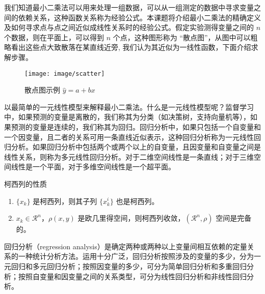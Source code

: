 \documentclass[cn,11pt,fancy,hide]{elegantbook}
\providecommand{\tightlist}{%
  \setlength{\itemsep}{0pt}\setlength{\parskip}{0pt}}
\begin{document}
我们知道最小二乘法可以用来处理一组数据，可以从一组测定的数据中寻求变量之间的依赖关系，这种函数关系称为经验公式。本课题将介绍最小二乘法的精确定义及如何寻求点与点之间近似成线性关系时的经验公式。假定实验测得变量之间的 \(n\) 个数据，则在平面上，可以得到 \(n\) 个点，这种图形称为 ``散点图''，从图中可以粗略看出这些点大致散落在某直线近旁, 我们认为其近似为一线性函数，下面介绍求解步骤。

\begin{figure}

{\centering \texttt{[image: image/scatter]} 

}

\caption{散点图示例 $\hat{y}=a+bx$}\label{fig:scatter}
\end{figure}

以最简单的一元线性模型来解释最小二乘法。什么是一元线性模型呢？监督学习中，如果预测的变量是离散的，我们称其为分类（如决策树，支持向量机等），如果预测的变量是连续的，我们称其为回归。回归分析中，如果只包括一个自变量和一个因变量，且二者的关系可用一条直线近似表示，这种回归分析称为一元线性回归分析。如果回归分析中包括两个或两个以上的自变量，且因变量和自变量之间是线性关系，则称为多元线性回归分析。对于二维空间线性是一条直线；对于三维空间线性是一个平面，对于多维空间线性是一个超平面。

\begin{shaded}

柯西列的性质

\begin{enumerate}
\def\labelenumi{\arabic{enumi}.}
\tightlist
\item
  \(\{x_k\}\) 是柯西列，则其子列 \(\{x_k^i\}\) 也是柯西列。
\item
  \(x_k\in \mathcal{R}^n\)，\(\rho(x,y)\) 是欧几里得空间，则柯西列收敛，\((\mathcal{R}^n,\rho)\) 空间是完备的。
\end{enumerate}

\end{shaded}

\begin{shaded}

回归分析（regression analysis）是确定两种或两种以上变量间相互依赖的定量关系的一种统计分析方法。运用十分广泛，回归分析按照涉及的变量的多少，分为一元回归和多元回归分析；按照因变量的多少，可分为简单回归分析和多重回归分析；按照自变量和因变量之间的关系类型，可分为线性回归分析和非线性回归分析。

\end{shaded}

\cleardoublepage
\end{document}
